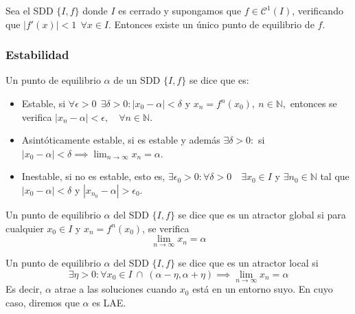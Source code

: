 \begin{nth}
	Sea el SDD $\{I,f\}$ donde $I$ es cerrado y supongamos que $f\in \mathcal{C}^1(I)$, verificando que $|f'(x)|< 1 \ \ \forall x \in I$. Entonces existe un único punto de equilibrio de $f$.
\end{nth}

\subsubsection{Estabilidad}
\begin{ndef}
	Un punto de equilibrio $\alpha$ de un SDD $\{I,f\}$ se dice que es:
	\begin{itemize}
	\item Estable, si $\forall \epsilon > 0 \ \ \exists \delta > 0 : |x_0 - \alpha| < \delta$ y $x_n = f^n(x_0),\ n \in \mathbb{N},$ entonces se verifica $|x_n - \alpha| < \epsilon, \quad \forall n \in \mathbb{N}$.
	\item Asintóticamente estable, si es estable y además $\exists \delta > 0 :$ si $|x_0 - \alpha| < \delta \implies \lim_{n\to \infty}x_n = \alpha$.
	\item Inestable, si no es estable, esto es, $\exists \epsilon_0 > 0 : \forall \delta > 0\quad \exists x_0 \in I$ y $\exists n_0 \in \mathbb{N}$ tal que $|x_0 - \alpha| < \delta$ y $|x_{n_0} - \alpha| > \epsilon_0$.
\end{itemize}
\end{ndef}

\begin{ndef}
	Un punto de equilibrio $\alpha$ del SDD $\{I,f\}$ se dice que es un atractor global si para cualquier $x_0 \in I$ y $x_n=f^n(x_0)$, se verifica $$\lim_{n \rightarrow \infty} x_n = \alpha$$
\end{ndef}

\begin{ndef}
	Un punto de equilibrio $\alpha$ del SDD $\{I,f\}$ se dice que es un atractor local si
$$\exists \eta > 0 : \forall x_0 \in I\ \cap\ (\alpha-\eta, \alpha+\eta) \implies \lim_{n \rightarrow \infty}x_n=\alpha$$
Es decir, $\alpha$ atrae a las soluciones cuando $x_0$ está en un entorno suyo. En cuyo caso, diremos que $\alpha$ es LAE.
\end{ndef}

